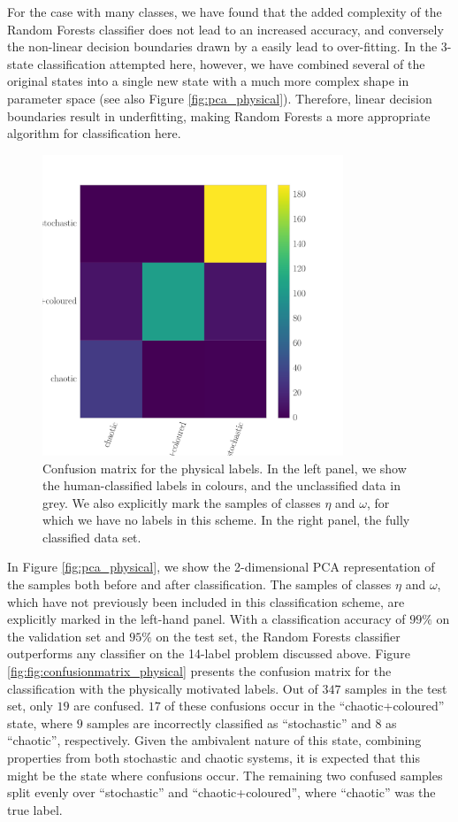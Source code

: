 \documentclass[12pt]{emulateapj}
\begin{document}
 For the case with many classes, we have found that the added complexity of the Random Forests classifier does not lead to an increased accuracy, and conversely the non-linear decision boundaries drawn by a easily lead to over-fitting. In the 3-state classification attempted here, however, we have combined several of the original states into a single new state with a much more complex shape in parameter space (see also Figure \ref{fig:pca_physical}). Therefore, linear decision boundaries result in underfitting, making Random Forests a more appropriate algorithm for classification here. 
\begin{figure}[htbp]
\begin{center}
\includegraphics[width=9cm]{grs1915_supervised_phys_cm.pdf}
\caption{Confusion matrix for the physical labels. In the left panel, we show the human-classified labels in colours, and the unclassified data in grey. We also 
explicitly mark the samples of classes $\eta$ and $\omega$, for which we have no labels in this scheme. In the right panel, the fully classified data set.} 
\label{fig:confusionmatrix_physical}
\end{center}
\end{figure}

In Figure \ref{fig:pca_physical}, we show the 2-dimensional PCA representation of the samples both before and after classification. The samples of classes $\eta$ and $\omega$, which have not previously been included in this classification scheme, are explicitly marked in the left-hand panel. 
With a classification accuracy of $99\%$ on the validation set and $95\%$ on the test set, the Random Forests classifier outperforms any classifier on the 14-label problem discussed above. Figure \ref{fig:fig:confusionmatrix_physical} presents the confusion matrix for the classification with the physically motivated labels.
Out of $347$ samples in the test set, only $19$ are confused. $17$ of these confusions occur in the ``chaotic+coloured'' state, where $9$ samples are incorrectly 
classified as ``stochastic'' and $8$ as ``chaotic'', respectively. Given the ambivalent nature of this state, combining properties from both stochastic and chaotic systems, it is expected that this might be the state where confusions occur. The remaining two confused samples split evenly over ``stochastic'' and ``chaotic+coloured'', where ``chaotic'' was the true label.
\end{document}

